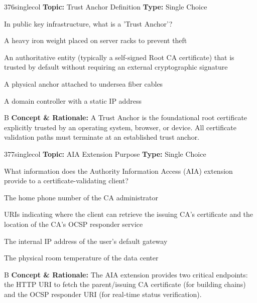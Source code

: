 \begin{qcard}{376}{singlecol}
\textcolor{darkslate!75}{\small\textbf{Topic:} Trust Anchor Definition \hfill \textbf{Type:} Single Choice}\vspace{0.4em}\par
In public key infrastructure, what is a 'Trust Anchor'?
\begin{qoptions}
\item A heavy iron weight placed on server racks to prevent theft
\item An authoritative entity (typically a self-signed Root CA certificate) that is trusted by default without requiring an external cryptographic signature
\item A physical anchor attached to undersea fiber cables
\item A domain controller with a static IP address
\end{qoptions}
\end{qcard}
\nopagebreak
\begin{explainbox}{B}
\textbf{Concept \& Rationale:} A Trust Anchor is the foundational root certificate explicitly trusted by an operating system, browser, or device. All certificate validation paths must terminate at an established trust anchor.
\end{explainbox}

\begin{qcard}{377}{singlecol}
\textcolor{darkslate!75}{\small\textbf{Topic:} AIA Extension Purpose \hfill \textbf{Type:} Single Choice}\vspace{0.4em}\par
What information does the Authority Information Access (AIA) extension provide to a certificate-validating client?
\begin{qoptions}
\item The home phone number of the CA administrator
\item URIs indicating where the client can retrieve the issuing CA's certificate and the location of the CA's OCSP responder service
\item The internal IP address of the user's default gateway
\item The physical room temperature of the data center
\end{qoptions}
\end{qcard}
\nopagebreak
\begin{explainbox}{B}
\textbf{Concept \& Rationale:} The AIA extension provides two critical endpoints: the HTTP URI to fetch the parent/issuing CA certificate (for building chains) and the OCSP responder URI (for real-time status verification).
\end{explainbox}


